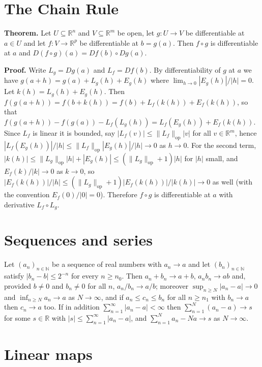 \documentclass[11pt]{article}
\newcommand{\N}{\mathbb{N}}
\newcommand{\R}{\mathbb{R}}
\begin{document}
\pagestyle{empty}

\section*{The Chain Rule}

\textbf{Theorem.} Let $U \subseteq \R^n$ and $V \subseteq \R^m$ be open, let $g : U \to V$ be differentiable at $a \in U$ and let $f : V \to \R^p$ be differentiable at $b = g(a)$. Then $f \circ g$ is differentiable at $a$ and $D(f \circ g)(a) = Df(b) \circ Dg(a)$.

\textbf{Proof.} Write $L_g = Dg(a)$ and $L_f = Df(b)$. By differentiability of $g$ at $a$ we have $g(a+h) = g(a) + L_g(h) + E_g(h)$ where $\lim_{h\to 0} |E_g(h)|/|h| = 0$. Let $k(h) = L_g(h) + E_g(h)$. Then $f(g(a+h)) = f(b+k(h)) = f(b) + L_f(k(h)) + E_f(k(h))$, so that $f(g(a+h)) - f(g(a)) - L_f(L_g(h)) = L_f(E_g(h)) + E_f(k(h))$. Since $L_f$ is linear it is bounded, say $|L_f(v)| \le \|L_f\|_{\mathrm{op}} |v|$ for all $v \in \R^m$, hence $|L_f(E_g(h))|/|h| \le \|L_f\|_{\mathrm{op}} |E_g(h)|/|h| \to 0$ as $h \to 0$. For the second term, $|k(h)| \le \|L_g\|_{\mathrm{op}} |h| + |E_g(h)| \le (\|L_g\|_{\mathrm{op}} + 1)|h|$ for $|h|$ small, and $E_f(k)/|k| \to 0$ as $k \to 0$, so $|E_f(k(h))|/|h| \le (\|L_g\|_{\mathrm{op}} + 1) |E_f(k(h))|/|k(h)| \to 0$ as well (with the convention $E_f(0)/|0| = 0$). Therefore $f \circ g$ is differentiable at $a$ with derivative $L_f \circ L_g$.

\section*{Sequences and series}

Let $(a_n)_{n \in \N}$ be a sequence of real numbers with $a_n \to a$ and let $(b_n)_{n \in \N}$ satisfy $|b_n - b| \le 2^{-n}$ for every $n \ge n_0$. Then $a_n + b_n \to a + b$, $a_n b_n \to ab$ and, provided $b \ne 0$ and $b_n \ne 0$ for all $n$, $a_n / b_n \to a/b$; moreover $\sup_{n \ge N} |a_n - a| \to 0$ and $\inf_{n \ge N} a_n \to a$ as $N \to \infty$, and if $a_n \le c_n \le b_n$ for all $n \ge n_1$ with $b_n \to a$ then $c_n \to a$ too. If in addition $\sum_{n=1}^{\infty} |a_n - a| < \infty$ then $\sum_{n=1}^{N} (a_n - a) \to s$ for some $s \in \R$ with $|s| \le \sum_{n=1}^{\infty} |a_n - a|$, and $\sum_{n=1}^{N} a_n - Na \to s$ as $N \to \infty$.

\section*{Linear maps}
\end{document}
